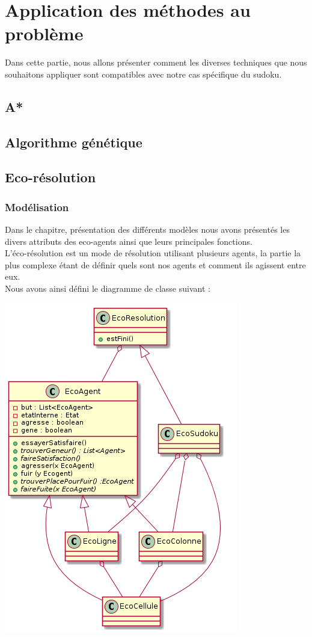 \chapter{Application des méthodes au problème}

	Dans cette partie, nous allons présenter comment les diverses techniques que nous souhaitons appliquer sont compatibles avec notre cas spécifique du sudoku.
    \section{A*}
    \section{Algorithme génétique}
    \section{Eco-résolution}
    \subsection{Modélisation}
    Dans le chapitre, présentation des différents modèles nous avons présentés les divers attributs des eco-agents ainsi que leurs principales fonctions. \\
    L'éco-résolution est un mode de résolution utilisant plusieurs agents, la partie la plus complexe étant de définir quels sont nos agents et comment ils agissent entre eux. \\
    Nous avons ainsi défini le diagramme de classe suivant : \\
    \begin{center}
    \includegraphics[scale=0.7]{diagrams/ecoResolution.png}
    \end{center} 

